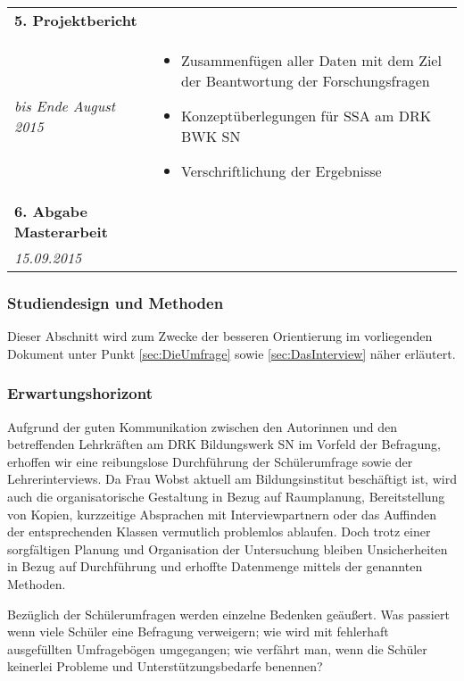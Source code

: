 \begin{longtable}{l|p{9.8cm}}
	\textbf{5. Projektbericht} & \\*
	\emph{bis Ende August 2015} &
	\vspace*{-0.6cm}
	\begin{itemize}[nosep,topsep=-0.6cm]
		\item Zusammenfügen aller Daten mit dem Ziel der Beantwortung der Forschungsfragen
		\item Konzeptüberlegungen für SSA am DRK BWK SN
		\item Verschriftlichung der Ergebnisse
	\end{itemize} \\
	
	\textbf{6. Abgabe Masterarbeit} & \\*
	\emph{15.09.2015} & \\
	
\end{longtable}

\newpage

\subsubsection{Studiendesign und Methoden}
\label{sec:StudiendesignUndMethoden}

Dieser Abschnitt wird zum Zwecke der besseren Orientierung im vorliegenden Dokument unter Punkt \ref{sec:DieUmfrage} sowie \ref{sec:DasInterview} näher erläutert.

\subsubsection{Erwartungshorizont}
\label{sec:Erwartungshorizont}

Aufgrund der guten Kommunikation zwischen den Autorinnen und den betreffenden Lehrkräften am DRK Bildungswerk SN im Vorfeld der Befragung, erhoffen wir eine reibungslose Durchführung der Schülerumfrage sowie der Lehrerinterviews. Da Frau Wobst aktuell am Bildungsinstitut beschäftigt ist, wird auch die organisatorische Gestaltung in Bezug auf Raumplanung, Bereitstellung von Kopien, kurzzeitige Absprachen mit Interviewpartnern oder das Auffinden der entsprechenden Klassen vermutlich problemlos ablaufen. Doch trotz einer sorgfältigen Planung und Organisation der Untersuchung bleiben Unsicherheiten in Bezug auf Durchführung und erhoffte Datenmenge mittels der genannten Methoden.

Bezüglich der Schülerumfragen werden einzelne Bedenken geäußert. Was passiert wenn viele Schüler eine Befragung verweigern; wie wird mit fehlerhaft ausgefüllten Umfragebögen umgegangen; wie verfährt man, wenn die Schüler keinerlei Probleme und Unterstützungsbedarfe benennen?

